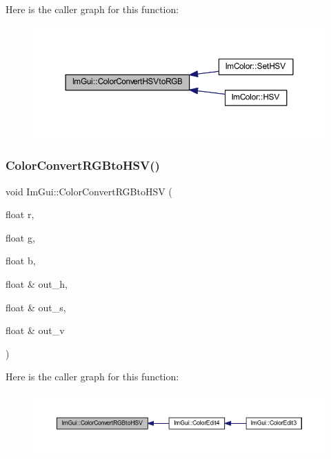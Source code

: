 Here is the caller graph for this function\+:
\nopagebreak
\begin{figure}[H]
\begin{center}
\leavevmode
\includegraphics[width=350pt]{namespace_im_gui_a074427678b3e56378b7dcdefa4c8b5c7_icgraph}
\end{center}
\end{figure}
\mbox{\label{namespace_im_gui_aaed5ed34aaaa02b61cbb67598c0ad9ca}} 
\subsubsection{\texorpdfstring{Color\+Convert\+R\+G\+Bto\+H\+S\+V()}{ColorConvertRGBtoHSV()}}
{\footnotesize\ttfamily void Im\+Gui\+::\+Color\+Convert\+R\+G\+Bto\+H\+SV (\begin{DoxyParamCaption}\item[{float}]{r,  }\item[{float}]{g,  }\item[{float}]{b,  }\item[{float \&}]{out\+\_\+h,  }\item[{float \&}]{out\+\_\+s,  }\item[{float \&}]{out\+\_\+v }\end{DoxyParamCaption})}

Here is the caller graph for this function\+:
\nopagebreak
\begin{figure}[H]
\begin{center}
\leavevmode
\includegraphics[width=350pt]{namespace_im_gui_aaed5ed34aaaa02b61cbb67598c0ad9ca_icgraph}
\end{center}
\end{figure}
\mbox{\label{namespace_im_gui_a74df648cad381b5ad979c3609b7f4b2a}} 
